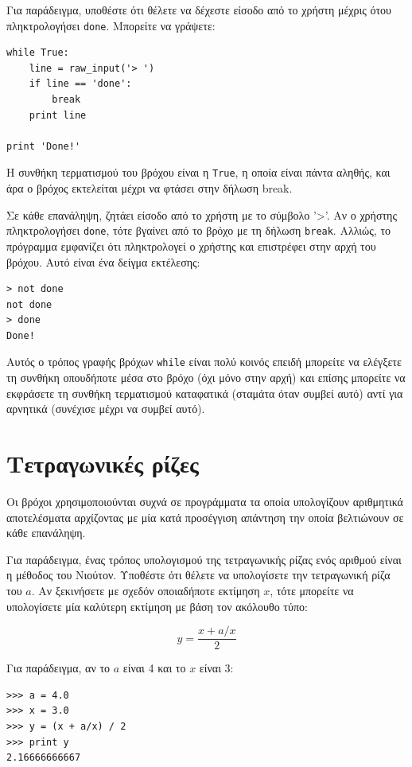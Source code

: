 \documentclass[10pt]{book}
\begin{document}
Για παράδειγμα, υποθέστε ότι θέλετε να δέχεστε είσοδο από το χρήστη μέχρις ότου
πληκτρολογήσει {\tt done}. Μπορείτε να γράψετε:

\begin{verbatim}
while True:
    line = raw_input('> ')
    if line == 'done':
        break
    print line

print 'Done!'
\end{verbatim}
%

Η συνθήκη τερματισμού του βρόχου είναι η {\tt True}, η οποία είναι
πάντα αληθής, και άρα ο βρόχος εκτελείται μέχρι να φτάσει στην δήλωση break.

Σε κάθε επανάληψη, ζητάει είσοδο από το χρήστη με το σύμβολο '>'.
Αν ο χρήστης πληκτρολογήσει {\tt done}, τότε βγαίνει από το βρόχο με τη δήλωση
{\tt break}. Αλλιώς, το πρόγραμμα εμφανίζει ότι πληκτρολογεί ο χρήστης και
επιστρέφει στην αρχή του βρόχου. Αυτό είναι ένα δείγμα εκτέλεσης:

\begin{verbatim}
> not done
not done
> done
Done!
\end{verbatim}
%

Αυτός ο τρόπος γραφής βρόχων {\tt while} είναι πολύ κοινός
επειδή μπορείτε να ελέγξετε τη συνθήκη οπουδήποτε μέσα στο βρόχο (όχι
μόνο στην αρχή) και επίσης μπορείτε να εκφράσετε τη συνθήκη τερματισμού
καταφατικά (σταμάτα όταν συμβεί αυτό) αντί για αρνητικά
(συνέχισε μέχρι να συμβεί αυτό).


\section{Τετραγωνικές ρίζες}
\label{squareroot}

Οι βρόχοι χρησιμοποιούνται συχνά σε προγράμματα τα οποία
υπολογίζουν αριθμητικά αποτελέσματα αρχίζοντας με μία κατά προσέγγιση 
απάντηση την οποία βελτιώνουν σε κάθε επανάληψη.

Για παράδειγμα, ένας τρόπος υπολογισμού της τετραγωνικής ρίζας ενός αριθμού
είναι η μέθοδος του Νιούτον. Υποθέστε ότι θέλετε να υπολογίσετε την τετραγωνική ρίζα του $a$. Αν ξεκινήσετε με σχεδόν οποιαδήποτε εκτίμηση $x$, τότε μπορείτε
να υπολογίσετε μία καλύτερη εκτίμηση με βάση τον ακόλουθο τύπο:

\[ y = \frac{x + a/x}{2} \]
%

Για παράδειγμα, αν το $a$ είναι 4 και το $x$ είναι 3:

\begin{verbatim}
>>> a = 4.0
>>> x = 3.0
>>> y = (x + a/x) / 2
>>> print y
2.16666666667
\end{verbatim}
%
\end{document}
